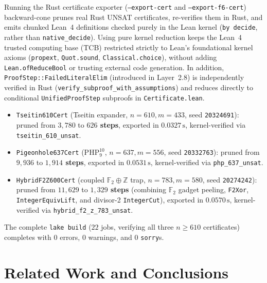\documentclass[11pt]{article}
\begin{document}
Running the Rust certificate exporter (\texttt{--export-cert} and \texttt{--export-f6-cert}) backward-cone prunes real Rust UNSAT certificates, re-verifies them in Rust, and emits chunked Lean~4 definitions checked purely in the Lean kernel (\texttt{by decide}, rather than \texttt{native\_decide}). Using pure kernel reduction keeps the Lean~4 trusted computing base (TCB) restricted strictly to Lean's foundational kernel axioms (\texttt{propext}, \texttt{Quot.sound}, \texttt{Classical.choice}), without adding \texttt{Lean.ofReduceBool} or trusting external code generation. In addition, \texttt{ProofStep::FailedLiteralElim} (introduced in Layer~2.8) is independently verified in Rust (\texttt{verify\_subproof\_with\_assumptions}) and reduces directly to conditional \texttt{UnifiedProofStep} subproofs in \texttt{Certificate.lean}.
\begin{itemize}
  \item \texttt{Tseitin610Cert} (Tseitin expander, $n = 610, m = 433$, seed \texttt{20324691}): pruned from $3{,}780$ to \textbf{$626$ steps}, exported in $0.0327\,\text{s}$, kernel-verified via \texttt{tseitin\_610\_unsat}.
  \item \texttt{Pigeonhole637Cert} ($\mathrm{PHP}_9^{10}$, $n = 637, m = 556$, seed \texttt{20332763}): pruned from $9{,}936$ to \textbf{$1{,}914$ steps}, exported in $0.0531\,\text{s}$, kernel-verified via \texttt{php\_637\_unsat}.
  \item \texttt{HybridF2Z600Cert} (coupled $\mathbb{F}_2 \oplus \mathbb{Z}$ trap, $n = 783, m = 580$, seed \texttt{20274242}): pruned from $11{,}629$ to \textbf{$1{,}329$ steps} (combining $\mathbb{F}_2$ gadget peeling, \texttt{F2Xor}, \texttt{IntegerEquivLift}, and divisor-2 \texttt{IntegerCut}), exported in $0.0570\,\text{s}$, kernel-verified via \texttt{hybrid\_f2\_z\_783\_unsat}.
\end{itemize}
The complete \texttt{lake build} ($22$ jobs, verifying all three $n \ge 610$ certificates) completes with $0$ errors, $0$ warnings, and $0$ \texttt{sorry}s.

\section{Related Work and Conclusions}
\end{document}
